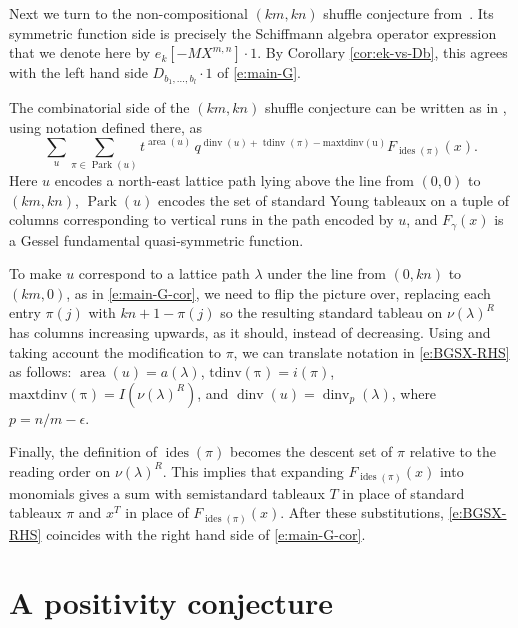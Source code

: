 \documentclass[12pt]{amsart}
\theoremstyle{definition}
\theoremstyle{remark}
\DeclareMathOperator{\dinv}{dinv}
\begin{document}
Next we turn to the
non-compositional $(km,kn)$ shuffle conjecture
from~\cite{BeGaSeXi16}.  Its symmetric function side is precisely
the Schiffmann algebra operator expression that we denote here by $e_{k}[-M
X^{m,n}]\cdot 1$.  By Corollary \ref{cor:ek-vs-Db}, this agrees with
the left hand side $D_{b_{1},\ldots,b_{l}}\cdot 1$ of
\eqref{e:main-G}.

The combinatorial
side of the  $(km,kn)$ shuffle conjecture can be written as in
\cite[\S 7]{BeGaSeXi16}, using notation defined there, as
\begin{equation}\label{e:BGSX-RHS}
\sum _{u} \sum _{\pi \in \operatorname{Park}(u)}
t^{\operatorname{area}(u)}\, q^{\dinv (u) + \operatorname{tdinv}(\pi ) -
\operatorname{maxtdinv(u )}} F_{\operatorname{ides}(\pi )}(x).
\end{equation}
Here $u$ encodes a north-east lattice path lying above the line from
$(0,0)$ to $(km,kn)$, $\operatorname{Park}(u)$ encodes the set of
standard Young tableaux on a tuple of columns corresponding to
vertical runs in the path encoded by $u$, and $F_{\gamma }(x)$ is a
Gessel fundamental quasi-symmetric function.

To make $u$ correspond to a lattice path $\lambda $ under the line
from $(0,kn)$ to $(km,0)$, as in \eqref{e:main-G-cor}, we need to flip
the picture over, replacing each entry $\pi (j)$ with $kn+1-\pi (j)$
so the resulting standard tableau on $\nu (\lambda )^{R}$ has columns
increasing upwards, as it should, instead of decreasing.  Using
\cite[Definition 7.1]{BeGaSeXi16} and taking account the modification
to $\pi $, we can translate notation in \eqref{e:BGSX-RHS} as follows:
$\operatorname{area}(u) = a(\lambda )$, $\operatorname{tdinv(\pi )} =
i(\pi )$, $\operatorname{maxtdinv(\pi )} = I(\nu (\lambda )^{R})$, and
$\dinv (u) = \dinv _{p}(\lambda )$, where $p = n/m - \epsilon $.


Finally, the definition of $\operatorname{ides}(\pi )$ becomes the
descent set of $\pi $ relative to the reading order on $\nu
(\lambda )^{R}$.  This implies that expanding
$F_{\operatorname{ides}(\pi )}(x)$ into monomials gives a sum with
semistandard tableaux $T$ in place of standard tableaux $\pi $ and
$x^{T}$ in place of $F_{\operatorname{ides}(\pi )}(x)$.  After these
substitutions, \eqref{e:BGSX-RHS} coincides with the right hand side
of \eqref{e:main-G-cor}.


\section{A positivity conjecture}
\label{s:positivity}
\end{document}
